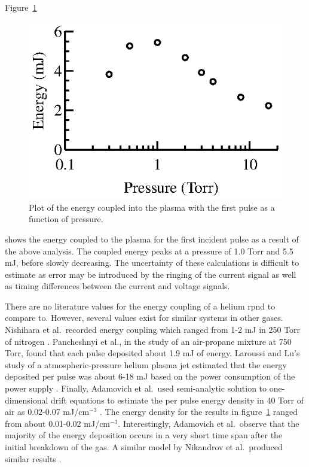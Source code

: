 Figure~\ref{fig:energies}
\begin{figure}
  \centering
  \includegraphics{./chapters/experiment/figures/energies.eps}
  \caption{Plot of the energy coupled into the plasma with the first pulse as
  a function of pressure.}
  \label{fig:energies}
\end{figure}
shows the energy coupled to the plasma for the first incident pulse as a result
of the above analysis. The coupled energy peaks at a pressure of 1.0 Torr and
5.5 mJ, before slowly decreasing. The uncertainty of these calculations is
difficult to estimate as error may be introduced by the ringing of the current
signal as well as timing differences between the current and voltage signals. 

There are no literature values for the energy coupling of a helium \acs{rpnd} to
compare to. However, several values exist for similar systems in other gases.
Nishihara et al.\ recorded energy coupling which ranged from 1-2 mJ in 250 Torr
of nitrogen \cite{Nishihara2006}. Pancheshnyi et al., in the study of an
air-propane mixture at 750 Torr, found that each pulse deposited about 1.9 mJ of
energy. Laroussi and Lu's study of a atmospheric-pressure helium plasma jet
estimated that the energy deposited per pulse was about 6-18 mJ based on the
power consumption of the power supply \cite{Laroussi2005}. Finally, Adamovich et
al.\ used semi-analytic solution to one-dimensional drift equations to estimate
the per pulse energy density in 40 Torr of air as 0.02-0.07 mJ/cm$^{-3}$
\cite{Adamovich2009}. The energy density for the results in
figure~\ref{fig:energies} ranged from about 0.01-0.02 mJ/cm$^{-3}$.
Interestingly, Adamovich et al.\ observe that the majority of the energy
deposition occurs in a very short time span after the initial breakdown of the
gas. A similar model by Nikandrov et al.\ produced similar results
\cite{Nikandrov2008}.

